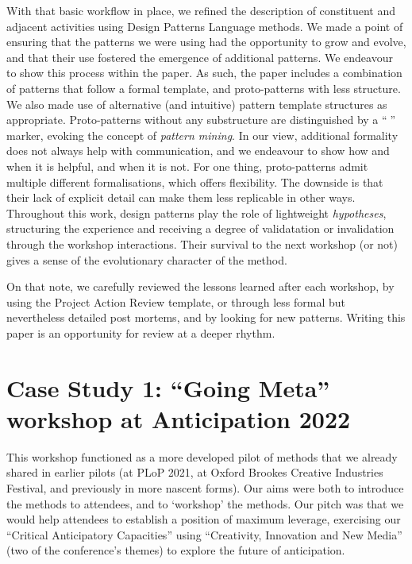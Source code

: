 \documentclass[acmlarge,timestamp]{acmart}
\begin{document}
With that basic workflow in place, we refined the description of
constituent and adjacent activities using Design Patterns Language
methods.  We made a point of ensuring that the patterns we were using
had the opportunity to grow and evolve, and that their use fostered
the emergence of additional patterns.  We endeavour to show this
process within the paper.  As such, the paper includes a combination
of patterns that follow a formal template, and proto-patterns with
less structure.  We also made use of alternative (and intuitive)
pattern template structures as appropriate.  Proto-patterns without
any substructure are distinguished by a “💎” marker, evoking the
concept of \emph{pattern mining}.  In our view, additional formality
does not always help with communication, and we endeavour to show how
and when it is helpful, and when it is not.  For one thing,
proto-patterns admit multiple different formalisations, which offers
flexibility.  The downside is that their lack of explicit detail can
make them less replicable in other ways.  Throughout this work, design
patterns play the role of lightweight \emph{hypotheses}, structuring
the experience and receiving a degree of validatation or invalidation
through the workshop interactions.  Their survival to the next
workshop (or not) gives a sense of the evolutionary character of the
method.

On that note, we carefully reviewed the lessons learned after each
workshop, by using the Project Action Review template, or through less
formal but nevertheless detailed post mortems, and by looking for new
patterns.  Writing this paper is an opportunity for review at a deeper
rhythm.

\clearpage

\section{Case Study 1: “Going Meta” workshop at Anticipation 2022}

This workshop functioned as a more developed pilot of methods that we
already shared in earlier pilots (at PLoP 2021, at Oxford Brookes
Creative Industries Festival, and previously in more nascent forms).
Our aims were both to introduce the methods to attendees, and to
‘workshop’ the methods.  Our pitch was that we would help attendees to
establish a position of maximum leverage, exercising our “Critical
Anticipatory Capacities” using “Creativity, Innovation and New Media”
(two of the conference’s themes) to explore the future of
anticipation.
\end{document}
